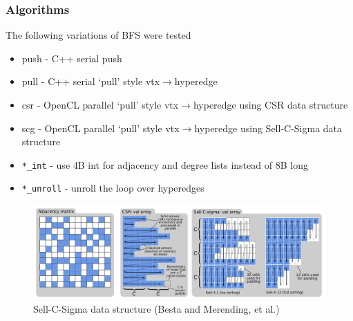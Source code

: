 \documentclass{beamer}
\begin{document}
\begin{frame}
  \frametitle{Algorithms}
  The following variations of BFS were tested
  \begin{itemize}
    \item push - C++ serial push
    \item pull - C++ serial `pull' style vtx$\rightarrow$hyperedge
    \item csr - OpenCL parallel `pull' style vtx$\rightarrow$hyperedge using CSR data
      structure
    \item scg - OpenCL parallel `pull' style vtx$\rightarrow$hyperedge using
      Sell-C-Sigma data structure
    \item \texttt{*\_int} - use 4B int for adjacency and degree lists instead of 8B long
    \item \texttt{*\_unroll} - unroll the loop over hyperedges
  \end{itemize}
  \begin{figure}
    \centering
    \includegraphics[width=.6\textwidth]{figures/sellcsigma.png}\\
    \small{Sell-C-Sigma data structure (Besta and Merending, et al.)}
  \end{figure}
\end{frame}
\end{document}
